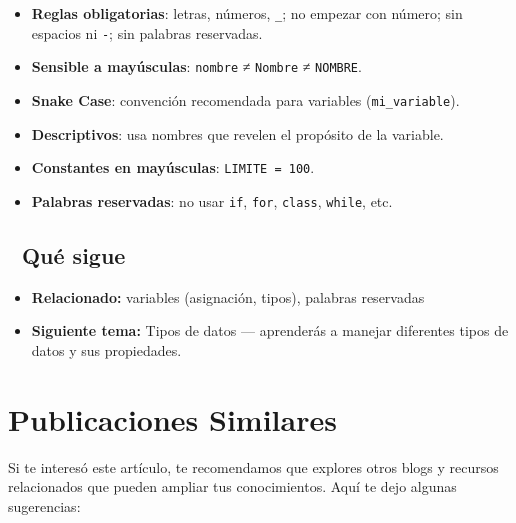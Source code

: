 \documentclass[
  doc,
  floatsintext,
  longtable,
  a4paper,
  nolmodern,
  notxfonts,
  notimes,
  12pt,
  colorlinks=true,linkcolor=blue,citecolor=blue,urlcolor=blue]{apa7}
\providecommand{\tightlist}{%
  \setlength{\itemsep}{0pt}\setlength{\parskip}{0pt}}
\begin{document}
\begin{itemize}
\tightlist
\item
  \textbf{Reglas obligatorias}: letras, números, \texttt{\_}; no empezar
  con número; sin espacios ni \texttt{-}; sin palabras reservadas.
\item
  \textbf{Sensible a mayúsculas}: \texttt{nombre} ≠ \texttt{Nombre} ≠
  \texttt{NOMBRE}.
\item
  \textbf{Snake Case}: convención recomendada para variables
  (\texttt{mi\_variable}).
\item
  \textbf{Descriptivos}: usa nombres que revelen el propósito de la
  variable.
\item
  \textbf{Constantes en mayúsculas}: \texttt{LIMITE\ =\ 100}.
\item
  \textbf{Palabras reservadas}: no usar \texttt{if}, \texttt{for},
  \texttt{class}, \texttt{while}, etc.
\end{itemize}

\subsection{🔗 Qué sigue}\label{quuxe9-sigue}

\begin{itemize}
\tightlist
\item
  \textbf{Relacionado:} variables (asignación, tipos), palabras
  reservadas
\item
  \textbf{Siguiente tema:} Tipos de datos --- aprenderás a manejar
  diferentes tipos de datos y sus propiedades.
\end{itemize}

\section{Publicaciones Similares}\label{publicaciones-similares}

Si te interesó este artículo, te recomendamos que explores otros blogs y
recursos relacionados que pueden ampliar tus conocimientos. Aquí te dejo
algunas sugerencias:
\end{document}
